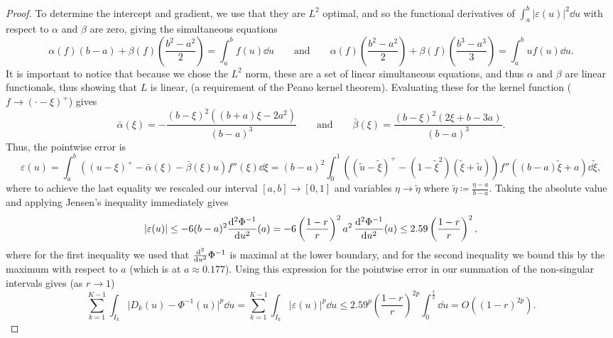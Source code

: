 \documentclass[9pt,a4paper,english]{extarticle}
\begin{document}
\begin{proof}
To determine the intercept and gradient, we use that they are $ L^2 $ optimal, and so the functional derivatives of $ \int_a^b \lvert \varepsilon(u) \rvert^2 \dd{u} $ with respect to $ \alpha $ and $ \beta $ are zero, giving the simultaneous equations
\begin{equation*}
\alpha(f)(b-a) + \beta(f) \left(\dfrac{b^2 - a^2}{2}\right)  = \int_{a}^{b} f(u) \dd{u} 
\qquad \text{and} \qquad 
\alpha(f)\left(\dfrac{b^2 - a^2}{2}\right) + \beta(f) \left(\dfrac{b^3 - a^3}{3}\right)  = \int_{a}^{b} u f(u) \dd{u}.
\end{equation*}
It is important to notice that because we chose the $ L^2 $ norm, these are a set of linear simultaneous equations, and thus $ \alpha $ and $ \beta $ are linear functionals, thus showing that $ L $ is linear, (a requirement of the Peano kernel theorem). Evaluating these for the kernel function ($ f \to (\cdot - \xi)^+  $) gives
\begin{equation*}
\bar{\alpha}(\xi)  = - \dfrac{(b - \xi)^2 ((b+a)\xi - 2a^2)}{(b - a)^3} 
\qquad \text{and} \qquad 
\label{eqt:peano_kernel_coefficient}
\bar{\beta}(\xi) = \dfrac{(b - \xi)^2 (2\xi + b - 3a)}{(b - a)^3}.
\end{equation*}
Thus, the pointwise error is 
\begin{equation*}
\varepsilon(u)  = \int_{a}^{b} ((u - \xi)^+ - \bar{\alpha}(\xi) - \bar{\beta}(\xi) u ) f''(\xi) \dd{\xi} = (b - a)^2 \int_{0}^{1} \left((\widetilde{u} - \widetilde{\xi})^+ - (1 - \widetilde{\xi}^2)(\widetilde{\xi} + \widetilde{u})\right) f''((b - a)\widetilde{\xi} + a) \dd{\widetilde{\xi}},
\end{equation*}
where to achieve the last equality we rescaled our interval $ [a, b] \to [0, 1] $  and variables $ \eta \to \tilde{\eta}  $ where $ \tilde{\eta} \coloneqq \tfrac{\eta - a}{b - a} $. Taking the absolute value and applying Jensen's inequality immediately gives 
\begin{equation*}
\lvert \varepsilon(u) \rvert \leq - 6 (b - a)^2  {\dv[2]{\Phi^{-1}}{u}}(a) = - 6 \left(\dfrac{1-r}{r}\right)^2 a^2\, {\dv[2]{\Phi^{-1}}{u}}(a) \leq 2.59 \left(\dfrac{1-r}{r}\right)^2,
\end{equation*}
where for the first inequality we used that $ {\dv[2]{}{u}}\Phi^{-1} $ is maximal at the lower boundary, and for the second inequality we bound this by the maximum with respect to $ a $ (which is at $a \approx 0.177$). Using this expression for the pointwise error in our summation of the non-singular intervals gives (as $ r \to 1 $)
\begin{equation*}
 \sum_{k=1}^{K-1} \int_{I_k} \lvert D_k(u) - \Phi^{-1}(u)\rvert^p \dd{u}
= \sum_{k = 1}^{K - 1} \int_{I_k} \lvert\varepsilon(u)\rvert^p \dd{u}
\leq 2.59^p \left(\dfrac{1 - r}{r}\right)^{2p}  \int_{0}^{\frac{1}{2}} \dd{u}
= O((1-r)^{2p}).
\end{equation*}


\end{proof}
\end{document}
